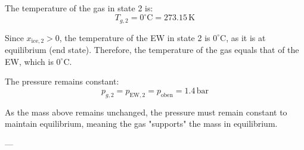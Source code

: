 The temperature of the gas in state 2 is:  
\[
T_{g,2} = 0^\circ \text{C} = 273.15 \, \text{K}
\]  

Since \( x_{\text{ice},2} > 0 \), the temperature of the EW in state 2 is \( 0^\circ \text{C} \), as it is at equilibrium (end state). Therefore, the temperature of the gas equals that of the EW, which is \( 0^\circ \text{C} \).  

The pressure remains constant:  
\[
p_{g,2} = p_{\text{EW},2} = p_{\text{oben}} = 1.4 \, \text{bar}
\]  

As the mass above remains unchanged, the pressure must remain constant to maintain equilibrium, meaning the gas "supports" the mass in equilibrium.

---